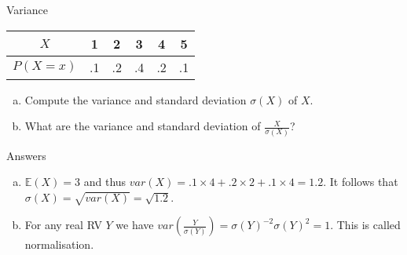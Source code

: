 \documentclass[14pt]{beamer}
\begin{document}
\begin{frame}{Variance}
\begin{table}
\center
\begin{tabular}{|c||c|c|c|c|c|}
\hline
$ X $		& 1	&	2	&	3	&	4	&	5	\\
\hline
$P(X = x)$	& .1 & .2	&	.4	&	.2	&	.1	\\
\hline 
\end{tabular}
\end{table}
\begin{enumerate}[a)]
\item Compute the variance and standard deviation $ \sigma(X) $ of $ X $.
\item What are the variance and standard deviation of $ \frac{X}{\sigma(X)} $?
\end{enumerate}
\end{frame}

\begin{frame}{Answers}
\begin{enumerate}[a)]
\item $ \mathbb{E}(X) = 3 $ and thus $ var(X) = .1 \times 4 + .2 \times 2 + .1 \times 4 = 1.2 $. It follows
that $ \sigma(X) = \sqrt{var(X)} = \sqrt{1.2} $.
\item For any real RV $ Y $ we have $ var\left(\frac{Y}{\sigma(Y)}\right) = \sigma(Y)^{-2}\sigma(Y)^{2}= 1 $. 
This is called normalisation.
\end{enumerate}
\end{frame}
\end{document}
